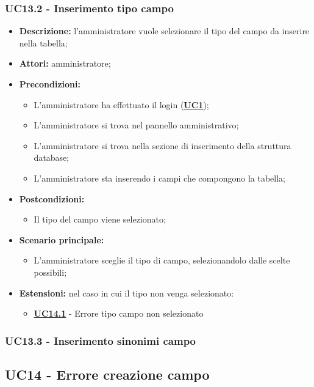 \subsubsection{UC13.2 - Inserimento tipo campo}
\label{sec:UC13.2}
\begin{itemize}
	\item \textbf{Descrizione:} l’amministratore vuole selezionare il tipo del campo da inserire nella tabella;
	\item \textbf{Attori:} amministratore;
	\item \textbf{Precondizioni:} 
	\begin{itemize}
		\item L’amministratore ha effettuato il login (\hyperref[sec:UC1]{\textbf{UC1}});
		\item L’amministratore si trova nel pannello amministrativo;
		\item L’amministratore si trova nella sezione di inserimento della struttura database;
		\item L’amministratore sta inserendo i campi che compongono la tabella;
	\end{itemize}
	\item \textbf{Postcondizioni:} 
	\begin{itemize}
		\item Il tipo del campo viene selezionato;
	\end{itemize}
	\item \textbf{Scenario principale:} 
	\begin{itemize}
		\item L’amministratore sceglie il tipo di campo, selezionandolo dalle scelte possibili;
	\end{itemize}
	\item \textbf{Estensioni:} nel caso in cui il tipo non venga selezionato:
	\begin{itemize}
		\item \hyperref[sec:UC14.1]{\textbf{UC14.1}} - Errore tipo campo non selezionato
	\end{itemize}
\end{itemize}

\subsubsection{UC13.3 - Inserimento sinonimi campo}
\label{sec:UC13.3}

\subsection{UC14 - Errore creazione campo}
\label{sec:UC14}

